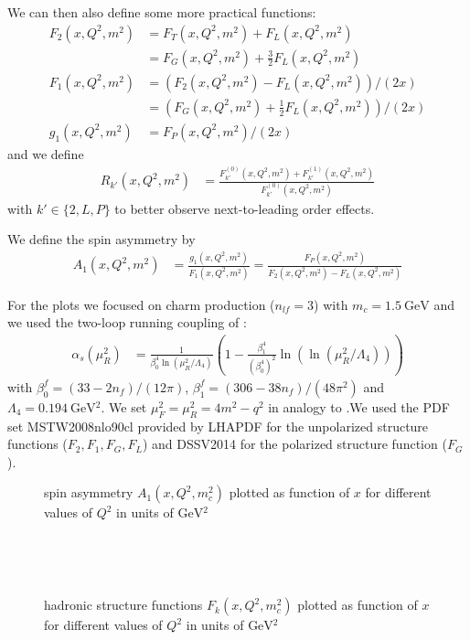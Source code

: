 We can then also define some more practical functions:
\begin{align}
F_{2}(x,Q^2,m^2) &= F_{T}(x,Q^2,m^2) + F_{L}(x,Q^2,m^2)\\
 &= F_{G}(x,Q^2,m^2) + \frac 3 2 F_{L}(x,Q^2,m^2)\\
F_1(x,Q^2,m^2) &= (F_{2}(x,Q^2,m^2)-F_L(x,Q^2,m^2))/(2x)\\
 &= \left(F_{G}(x,Q^2,m^2)+\frac 1 2 F_{L}(x,Q^2,m^2)\right)/(2x)\\
g_1(x,Q^2,m^2) &= F_{P}(x,Q^2,m^2)/(2x)
\end{align}
and we define
\begin{align}
R_{k'}(x,Q^2,m^2) &= \frac{F_{k'}^{(0)}(x,Q^2,m^2)+F_{k'}^{(1)}(x,Q^2,m^2)}{F_{k'}^{(0)}(x,Q^2,m^2)}
\end{align}
with $k'\in\{2,L,P\}$ to better observe next-to-leading order effects.

We define the spin asymmetry by
\begin{align}
A_1(x,Q^2,m^2) &= \frac{g_1(x,Q^2,m^2)}{F_1(x,Q^2,m^2)} = \frac{F_P(x,Q^2,m^2)}{F_2(x,Q^2,m^2)-F_L(x,Q^2,m^2)}
\end{align}

For the plots we focused on charm production ($n_{lf}=3$) with $m_c=\SI{1.5}{\GeV}$ and we used the two-loop running coupling of \cite{Altarelli:1988qr}:
\begin{align}
\alpha_s(\mu_R^2) &= \frac{1}{\beta_{0}^4\ln(\mu_R^2/\Lambda_4)}\left(1-\frac{\beta_1^4}{(\beta_0^4)^2} \ln(\ln(\mu_R^2/\Lambda_4))\right)
\end{align}
with $\beta_0^f=(33-2n_f)/(12\pi)$, $\beta_1^f=(306-38n_f)/(48\pi^2)$ and $\Lambda_4=\SI{0.194}{\GeV^2}$. We set $\mu_F^2=\mu_R^2=4m^2-q^2$ in analogy to \cite{Laenen1993162}.We used the PDF set MSTW2008nlo90cl\cite{Martin:2009iq,Martin:2009bu,Martin:2010db} provided by LHAPDF\cite{LHAPDF6} for the unpolarized structure functions ($F_2,F_1,F_G,F_L$) and DSSV2014\cite{PhysRevLett.113.012001} for the polarized structure function ($F_G$).


\begin{figure}[ht!]
\centering

\caption{spin asymmetry $A_{1}(x,Q^2,m_c^2)$ plotted as function of $x$ for different values of $Q^2$ in units of $\si{\GeV^2}$}\label{fig:A}
\end{figure}

\pagebreak
\begin{figure}[ht!]
\centering
\begin{subfigure}[t]{\textwidth}
	
\end{subfigure}\\%
\begin{subfigure}[t]{\textwidth}
	
\end{subfigure}\\%
\begin{subfigure}[t]{\textwidth}
	
\end{subfigure}
\caption{hadronic structure functions $F_{k}(x,Q^2,m_c^2)$ plotted as function of $x$ for different values of $Q^2$ in units of $\si{\GeV^2}$}\label{fig:F001}
\end{figure}

